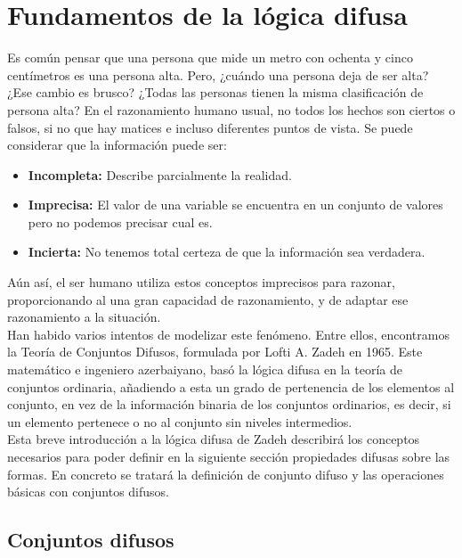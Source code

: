 \section{Fundamentos de la lógica difusa}
Es común pensar que una persona que mide un metro con ochenta y cinco centímetros es una persona alta. Pero, ¿cuándo una persona deja de ser alta? ¿Ese cambio es brusco? ¿Todas las personas tienen la misma clasificación de persona alta? En el razonamiento humano usual, no todos los hechos son ciertos o falsos, si no que hay matices e incluso diferentes puntos de vista. Se puede considerar que la información puede ser:

\begin{itemize}
\item \textbf{Incompleta:} Describe parcialmente la realidad.
\item \textbf{Imprecisa:} El valor de una variable se encuentra en un conjunto de valores pero no podemos precisar cual es.
\item \textbf{Incierta:} No tenemos total certeza de que la información sea verdadera.
\end{itemize}

Aún así, el ser humano utiliza estos conceptos imprecisos para razonar, proporcionando al una gran capacidad de razonamiento, y de adaptar ese razonamiento a la situación.\\

Han habido varios intentos de modelizar este fenómeno. Entre ellos, encontramos la Teoría de Conjuntos Difusos, formulada por Lofti A. Zadeh en 1965\cite{Zadeh-Fuzzy-1965}. Este matemático e ingeniero azerbaiyano, basó la lógica difusa en la teoría de conjuntos ordinaria, añadiendo a esta un grado de pertenencia de los elementos al conjunto, en vez de la información binaria de los conjuntos ordinarios, es decir, si un elemento pertenece o no al conjunto sin niveles intermedios.\\

Esta breve introducción a la lógica difusa de Zadeh describirá los conceptos necesarios para poder definir en la siguiente sección propiedades difusas sobre las formas. En concreto se tratará la definición de conjunto difuso y las operaciones básicas con conjuntos difusos.\\

\subsection{Conjuntos difusos}

